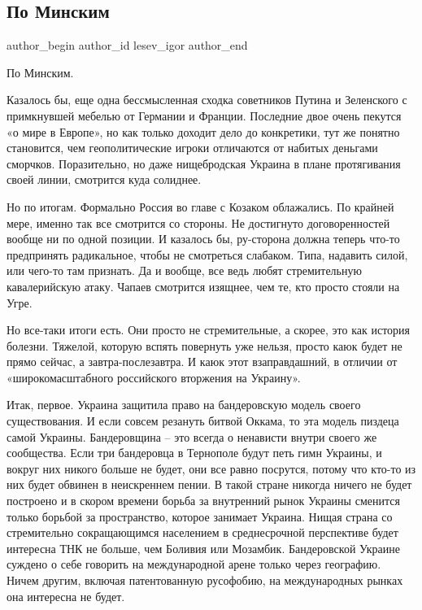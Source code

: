  
 
 
 
 
 
\subsection{По Минским}
\label{sec:11_02_2022.tg.lesev_igor.1.po_minskim}
 
\ifcmt
 author_begin
   author_id lesev_igor
 author_end
\fi

По Минским.

Казалось бы, еще одна бессмысленная сходка советников Путина и Зеленского с
примкнувшей мебелью от Германии и Франции. Последние двое очень пекутся «о мире
в Европе», но как только доходит дело до конкретики, тут же понятно становится,
чем геополитические игроки отличаются от набитых деньгами сморчков.
Поразительно, но даже нищебродская Украина в плане протягивания своей линии,
смотрится куда солиднее.

Но по итогам. Формально Россия во главе с Козаком облажались. По крайней мере,
именно так все смотрится со стороны. Не достигнуто договоренностей вообще ни по
одной позиции. И казалось бы, ру-сторона должна теперь что-то предпринять
радикальное, чтобы не смотреться слабаком. Типа, надавить силой, или чего-то
там признать. Да и вообще, все ведь любят стремительную кавалерийскую атаку.
Чапаев смотрится изящнее, чем те, кто просто стояли на Угре.

Но все-таки итоги есть. Они просто не стремительные, а скорее, это как история
болезни. Тяжелой, которую вспять повернуть уже нельзя, просто каюк будет не
прямо сейчас, а завтра-послезавтра. И каюк этот взаправдашний, в отличии от
«широкомасштабного российского вторжения на Украину».

Итак, первое. Украина защитила право на бандеровскую модель своего
существования. И если совсем резануть битвой Оккама, то эта модель пиздеца
самой Украины. Бандеровщина – это всегда о ненависти внутри своего же
сообщества. Если три бандеровца в Тернополе будут петь гимн Украины, и вокруг
них никого больше не будет, они все равно посрутся, потому что кто-то из них
будет обвинен в неискреннем пении. В такой стране никогда ничего не будет
построено и в скором времени борьба за внутренний рынок Украины сменится только
борьбой за пространство, которое занимает Украина. Нищая страна со стремительно
сокращающимся населением в среднесрочной перспективе будет интересна ТНК не
больше, чем Боливия или Мозамбик. Бандеровской Украине суждено о себе говорить
на международной арене только через географию. Ничем другим, включая
патентованную русофобию, на международных рынках она интересна не будет.

